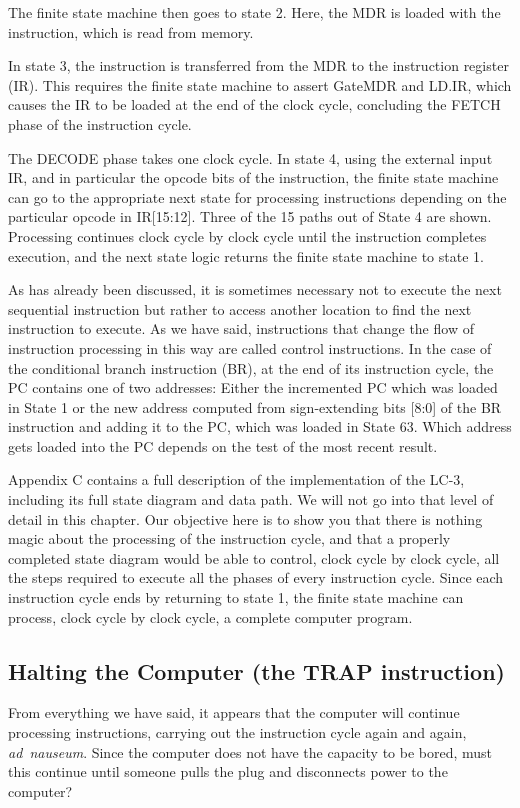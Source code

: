 \documentclass{patt}
\begin{document}
The finite state machine then goes to state 2.  Here, the MDR is loaded with
the instruction, which is read from memory.

In state 3, the instruction is transferred from the MDR to the instruction
register (IR).  This requires the finite state machine to assert GateMDR and
LD.IR, which causes the IR to be loaded at the end of the clock cycle,
concluding the FETCH phase of the instruction cycle.

The DECODE phase takes one clock cycle.  In state 4, using the external 
input IR,
and in particular the opcode bits of the instruction, the finite state machine
can go to the appropriate next state for processing instructions depending on
the particular opcode in IR[15:12].  Three of the 15 paths out of State 4 are
shown.  Processing continues clock cycle by clock cycle until the instruction
completes execution, and the next state logic returns the finite state machine
to state 1.

As has already been discussed, it is sometimes necessary not to execute the 
next sequential instruction but rather to access another location to find the
next instruction to execute.  As we have said, instructions that change the
flow of instruction processing in this way are called control instructions.  
In the case of the conditional branch instruction (BR), at the end of its
instruction cycle, the PC contains one of two addresses: Either the incremented
PC which was loaded in State 1 or the new address computed from sign-extending 
bits [8:0] of the BR instruction and adding it to the PC, which was loaded in
State 63.  Which address gets loaded into the PC depends on the test of the
most recent result. 

Appendix C contains a full description of the implementation of the LC-3,
including its full state diagram and data path.  We will not go into that
level of detail in this chapter.  Our objective here is to show you that
there is nothing magic about the processing of the instruction cycle, and that
a properly completed state diagram would be able to control, clock cycle by
clock cycle, all the steps required to execute all the phases of every
instruction cycle.  Since each instruction cycle ends by returning to state 1,
the finite state machine can process, clock cycle by clock cycle, a complete 
computer program.

\FloatBarrier
\vspace{-12pt}
\subsection{Halting the Computer (the TRAP instruction)}
From everything we have said, it appears that the computer will
continue \nobreak processing
instructions, carrying out the instruction cycle again and again, {\em
  ad~\nobreak nauseum}.  Since the
computer does not have the capacity to be bored, must this continue until 
someone pulls the plug and disconnects power to the computer?
\end{document}
